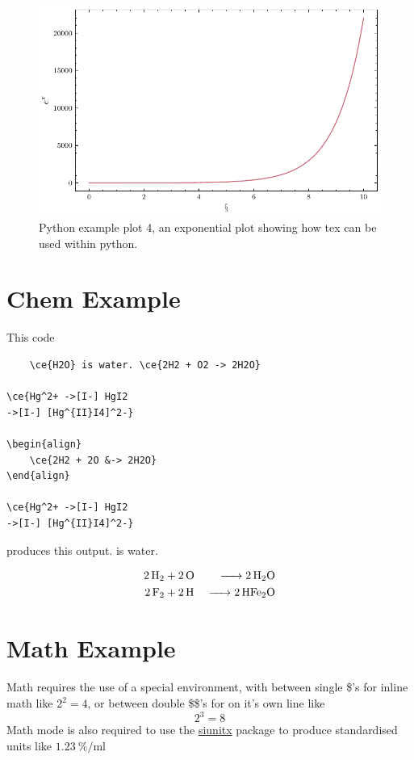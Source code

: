 \begin{figure}[h!]
    \centering
    \includegraphics{Python plotting example/example_4.pdf}
    \caption[Python example plot 4]{Python example plot 4, an exponential plot showing how tex can be used within python.}
    \label{fig:ch2/example_4}
\end{figure}

\section{Chem Example}
This code
\begin{lstlisting}
    \ce{H2O} is water. \ce{2H2 + O2 -> 2H2O}

\ce{Hg^2+ ->[I-] HgI2
->[I-] [Hg^{II}I4]^2-}

\begin{align}
    \ce{2H2 + 2O &-> 2H2O}
\end{align}

\ce{Hg^2+ ->[I-] HgI2
->[I-] [Hg^{II}I4]^2-}
\end{lstlisting}

produces this output. 
 is water. 


\begin{align}
    \ce{2H2& + 2O &-> 2H2O} \\
   \ce{2F2& + 2H &-> 2HFe2O}
\end{align}


\section{Math Example}
Math requires the use of a special environment, with between single \$'s for inline math like $2^2=4$, or between double \$\$'s for on it's own line like $$2^3=8$$ Math mode is also required to use the \href{https://mirror.aarnet.edu.au/pub/CTAN/macros/latex/contrib/siunitx/siunitx.pdf}{siunitx} package to produce standardised units like $\SI{1.23}{\percent\per\milli\litre}$


